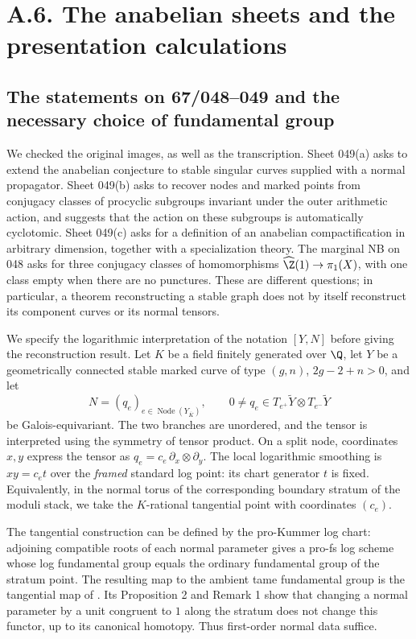 \section{A.6. The anabelian sheets and the presentation calculations}
\subsection{The statements on 67/048--049 and the necessary choice of fundamental group}

We checked the original images, as well as the transcription. Sheet 049(a) asks to extend the anabelian conjecture to stable singular curves supplied with a normal propagator. Sheet 049(b) asks to recover nodes and marked points from conjugacy classes of procyclic subgroups invariant under the outer arithmetic action, and suggests that the action on these subgroups is automatically cyclotomic. Sheet 049(c) asks for a definition of an anabelian compactification in arbitrary dimension, together with a specialization theory. The marginal NB on 048 asks for three conjugacy classes of homomorphisms $\widehat{\Z}(1)\to\pi_1(X)$, with one class empty when there are no punctures. These are different questions; in particular, a theorem reconstructing a stable graph does not by itself reconstruct its component curves or its normal tensors.

We specify the logarithmic interpretation of the notation $[Y,N]$ before giving the reconstruction result. Let $K$ be a field finitely generated over $\Q$, let $Y$ be a geometrically connected stable marked curve of type $(g,n)$, $2g-2+n>0$, and let
\[
 N=(q_e)_{e\in\operatorname{Node}(Y_{\overline{K}})},
 \qquad 0\ne q_e\in T_{e^+}\widetilde{Y}\otimes
                         T_{e^-}\widetilde{Y}
\]
be Galois-equivariant. The two branches are unordered, and the tensor is interpreted using the symmetry of tensor product. On a split node, coordinates $x,y$ express the tensor as $q_e=c_e\,\partial_x\otimes\partial_y$. The local logarithmic smoothing is $xy=c_e t$ over the \emph{framed} standard log point: its chart generator $t$ is fixed. Equivalently, in the normal torus of the corresponding boundary stratum of the moduli stack, we take the $K$-rational tangential point with coordinates $(c_e)$.

The tangential construction can be defined by the pro-Kummer log chart: adjoining compatible roots of each normal parameter gives a pro-fs log scheme whose log fundamental group equals the ordinary fundamental group of the stratum point. The resulting map to the ambient tame fundamental group is the tangential map of \cite[Proposition 1]{HoshiMatsumotoNakayama2026A567}. Its Proposition 2 and Remark 1 show that changing a normal parameter by a unit congruent to $1$ along the stratum does not change this functor, up to its canonical homotopy. Thus first-order normal data suffice.

